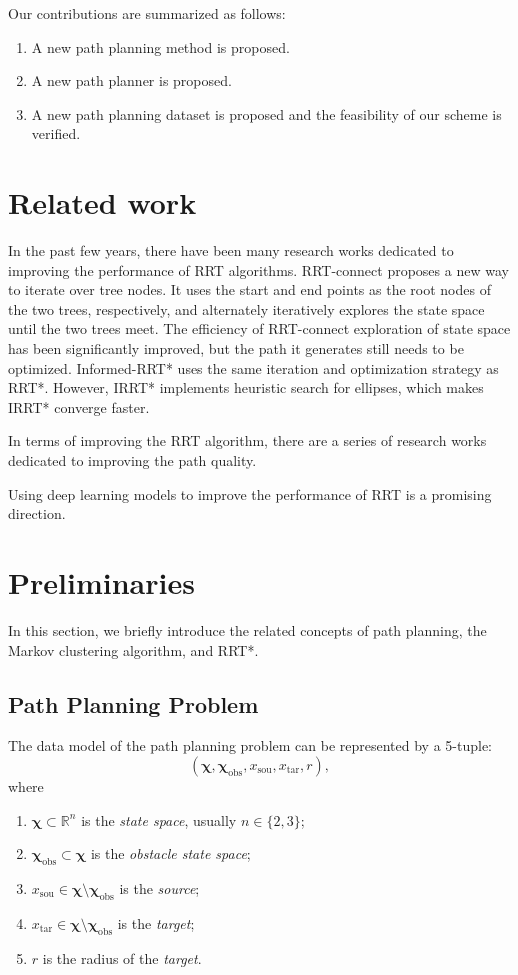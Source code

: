 \documentclass[smallcondensed]{svjour3}     %
\begin{document}
Our contributions are summarized as follows:
\begin{enumerate}[1)]
	\item A new path planning method is proposed.
	\item A new path planner is proposed.
	\item A new path planning dataset is proposed and the feasibility of our scheme is verified.
\end{enumerate}

\section{Related work}\label{section: related-work}
In the past few years, there have been many research works dedicated to improving the performance of RRT algorithms.
RRT-connect proposes a new way to iterate over tree nodes. 
It uses the start and end points as the root nodes of the two trees, respectively, and alternately iteratively explores the state space until the two trees meet.
The efficiency of RRT-connect exploration of state space has been significantly improved, but the path it generates still needs to be optimized.
Informed-RRT* uses the same iteration and optimization strategy as RRT*.
However, IRRT* implements heuristic search for ellipses, which makes IRRT* converge faster.

In terms of improving the RRT algorithm, there are a series of research works dedicated to improving the path quality.

Using deep learning models to improve the performance of RRT is a promising direction.

\section{Preliminaries}\label{section: Preliminaries}
In this section, we briefly introduce the related concepts of path planning, the Markov clustering algorithm, and RRT*.

\subsection{Path Planning Problem}\label{subsection: path planning problem}
The data model of the path planning problem can be represented by a 5-tuple:
\begin{equation}\label{equation: model}
(\bm{\chi}, \bm{\chi}_{\textrm{obs}}, x_{\textrm{sou}}, x_{\textrm{tar}}, r),
\end{equation}
where
\begin{enumerate}[1)]
	\item $\bm{\chi} \subset \mathbb{R}^n$ is the \emph{state space}, usually $n \in \{2, 3\}$;
	\item $\bm{\chi}_{\textrm{obs}} \subset \bm{\chi}$ is the \emph{obstacle state space};
	\item $x_{\textrm{sou}} \in \bm{\chi} \setminus \bm{\chi}_{\textrm{obs}}$ is the \emph{source};
	\item $x_{\textrm{tar}} \in \bm{\chi} \setminus \bm{\chi}_{\textrm{obs}}$ is the \emph{target};
	\item $r$ is the radius of the \emph{target}.
\end{enumerate}
\end{document}
